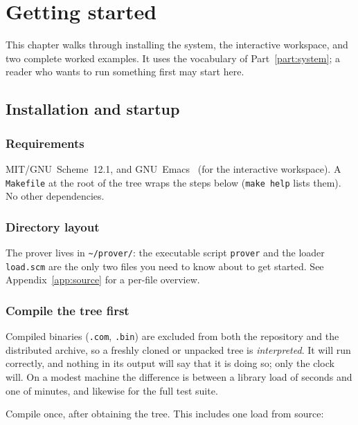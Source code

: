 \chapter{Getting started}
\label{ch:quickstart}

This chapter walks through installing the system, the interactive workspace, and two complete worked examples.  It uses the vocabulary of Part~\ref{part:system}; a reader who wants to run something first may start here.

\label{sec:quickstart-chap}

\section{Installation and startup}

\subsection{Requirements}

MIT/GNU~Scheme~12.1, and GNU~Emacs~\cite{Emacs} (for the interactive workspace).
A \texttt{Makefile} at the root of the tree wraps the steps below
(\texttt{make help} lists them).
No other dependencies.

\subsection{Directory layout}

The prover lives in \texttt{\textasciitilde/prover/}: the executable
script \texttt{prover} and the loader \texttt{load.scm} are the only
two files you need to know about to get started.  See
Appendix~\ref{app:source} for a per-file overview.

\subsection{Compile the tree first}
\label{sec:compile-first}

Compiled binaries (\texttt{.com}, \texttt{.bin}) are excluded from both the
repository and the distributed archive, so a freshly cloned or unpacked tree is
\emph{interpreted}.  It will run correctly, and nothing in its output will say
that it is doing so; only the clock will.  On a modest machine the difference is
between a library load of seconds and one of minutes, and likewise for the
full test suite.

Compile once, after obtaining the tree.  This includes one load from source:

